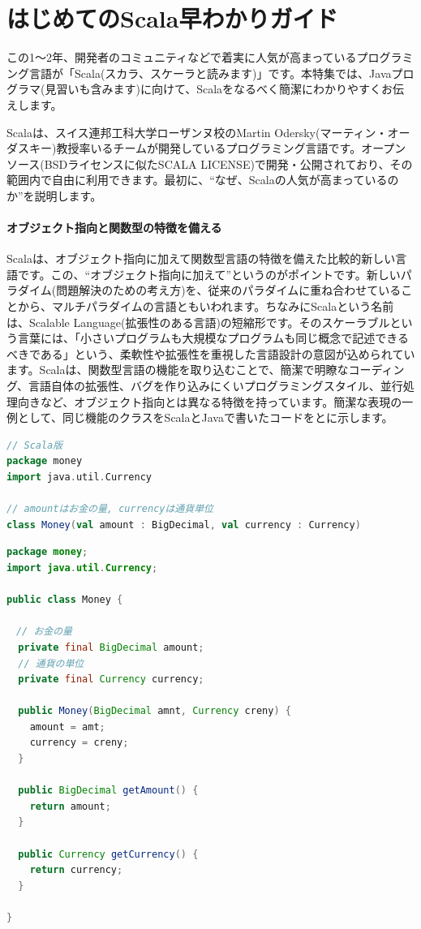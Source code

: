 \part{はじめてのScala早わかりガイド}
\begin{screen}
この1〜2年、開発者のコミュニティなどで着実に人気が高まっているプログラミング言語が「Scala(スカラ、スケーラと読みます)」です。本特集では、Javaプログラマ(見習いも含みます)に向けて、Scalaをなるべく簡潔にわかりやすくお伝えします。
\end{screen}

Scalaは、スイス連邦工科大学ローザンヌ校のMartin Odersky(マーティン・オーダスキー)教授率いるチームが開発しているプログラミング言語です。オープンソース(BSDライセンスに似たSCALA LICENSE)で開発・公開されており、その範囲内で自由に利用できます。最初に、“なぜ、Scalaの人気が高まっているのか”を説明します。

\subsection*{オブジェクト指向と関数型の特徴を備える}
Scalaは、オブジェクト指向に加えて関数型言語の特徴を備えた比較的新しい言語です。この、“オブジェクト指向に加えて”というのがポイントです。新しいパラダイム(問題解決のための考え方)を、従来のパラダイムに重ね合わせていることから、マルチパラダイムの言語ともいわれます。ちなみにScalaという名前は、Scalable Language(拡張性のある言語)の短縮形です。そのスケーラブルという言葉には、「小さいプログラムも大規模なプログラムも同じ概念で記述できるべきである」という、柔軟性や拡張性を重視した言語設計の意図が込められています。Scalaは、関数型言語の機能を取り込むことで、簡潔で明瞭なコーディング、言語自体の拡張性、バグを作り込みにくいプログラミングスタイル、並行処理向きなど、オブジェクト指向とは異なる特徴を持っています。簡潔な表現の一例として、同じ機能のクラスをScalaとJavaで書いたコードをとに示します。

\begin{lstlisting}[language=scala, label=src:money_scala, caption=お金を表すクラスのScala版]
// Scala版
package money
import java.util.Currency

// amountはお金の量, currencyは通貨単位
class Money(val amount : BigDecimal, val currency : Currency)
\end{lstlisting}

\begin{lstlisting}[language=java, label=src:money_java, caption=お金を表すクラスのJava版]
package money;
import java.util.Currency;

public class Money {

　// お金の量
  private final BigDecimal amount;
  // 通貨の単位
  private final Currency currency;

  public Money(BigDecimal amnt, Currency creny) {
    amount = amt;
    currency = creny;
  }

  public BigDecimal getAmount() {
    return amount;
  }

  public Currency getCurrency() {
    return currency;
  }

}
\end{lstlisting}

